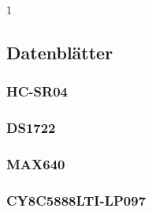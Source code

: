 \documentclass[12pt,a4paper]{article}
\def\datasheets{1}
\begin{document}
\if\datasheets1
	\subsection{Datenblätter}

	\subsubsection{HC-SR04}
	

	\subsubsection{DS1722}
	

	\subsubsection{MAX640}
	

	\subsubsection{CY8C5888LTI-LP097}
	

\fi %
\end{document}
